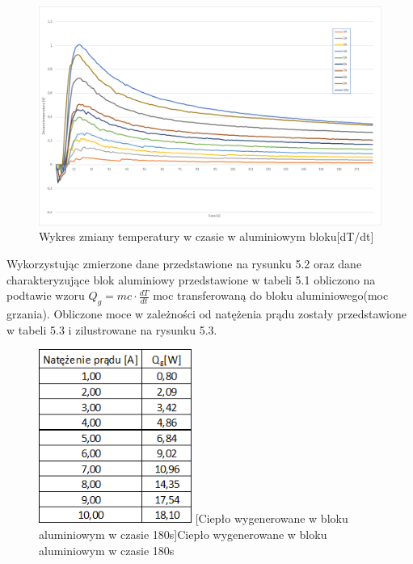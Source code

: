 \documentclass[oneside]{mgr}
\begin{document}
\begin{center}
\begin{figure}[h!]
    \centering
    \includegraphics[width=\textwidth]{Qg_wykres.png}
    \caption{Wykres zmiany temperatury w czasie w aluminiowym bloku[dT/dt]}
    \end{figure}
\end{center}

Wykorzystując zmierzone dane przedstawione na rysunku 5.2 oraz dane charakteryzujące blok aluminiowy przedstawione w tabeli 5.1 obliczono na podtawie wzoru $Q_g = mc \cdot \frac{dT}{dt}$  moc transferowaną do bloku aluminiowego(moc grzania). Obliczone moce w zależności od natężenia prądu zostały przedstawione w tabeli 5.3 i zilustrowane na rysunku 5.3.

\begin{center}
\begin{figure}[h!]
    \centering
    \includegraphics[width=5cm]{Qg_dane.png}
    [Ciepło wygenerowane w bloku aluminiowym w czasie 180s]{Ciepło wygenerowane w bloku aluminiowym w czasie 180s}
    \end{figure}
\end{center}
\end{document}
